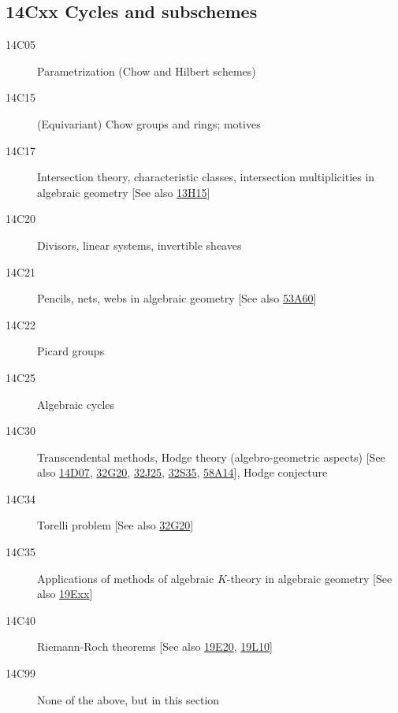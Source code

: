 \subsection*{14Cxx Cycles and subschemes }\label{14Cxx}
\begin{description}               
\item [14C05]\label{14C05} Parametrization (Chow and Hilbert schemes)
\item [14C15]\label{14C15} (Equivariant) Chow groups and rings; motives
\item [14C17]\label{14C17} Intersection theory, characteristic classes, intersection multiplicities in algebraic geometry [See also \hyperref[13H15]{13H15}]
\item [14C20]\label{14C20} Divisors, linear systems, invertible sheaves
\item [14C21]\label{14C21} Pencils, nets, webs in algebraic geometry [See also \hyperref[53A60]{53A60}]
\item [14C22]\label{14C22} Picard groups
\item [14C25]\label{14C25} Algebraic cycles
\item [14C30]\label{14C30} Transcendental methods, Hodge theory (algebro-geometric aspects) [See also \hyperref[14D07]{14D07}, \hyperref[32G20]{32G20}, \hyperref[32J25]{32J25}, \hyperref[32S35]{32S35}, \hyperref[58A14]{58A14}], Hodge conjecture
\item [14C34]\label{14C34} Torelli problem [See also \hyperref[32G20]{32G20}]
\item [14C35]\label{14C35} Applications of methods of algebraic $K$-theory in algebraic geometry [See also \hyperref[19Exx]{19Exx}]
\item [14C40]\label{14C40} Riemann-Roch theorems [See also \hyperref[19E20]{19E20}, \hyperref[19L10]{19L10}]
\item [14C99]\label{14C99} None of the above, but in this section
\end{description}          
